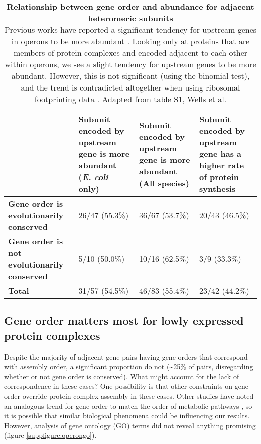 \documentclass[a4paper,11pt,twoside,openright]{scrbook}
\begin{document}
\begin{table}[h]
    \captionsetup{width=0.9\textwidth}
    \caption[Relationship between gene order and abundance for adjacent
    heteromeric subunits]{\sffamily \textbf{Relationship between gene order and
    abundance for adjacent heteromeric subunits} \\ \small Previous works have
    reported a significant tendency for upstream genes in operons to be more
    abundant \cite{Nishizaki2007,Lim2011}. Looking only at proteins that are
    members of protein complexes and encoded adjacent to each other within
    operons, we see a slight tendency for upstream genes to be more abundant.
    However, this is not significant (using the binomial test), and the trend is
    contradicted altogether when using ribosomal footprinting data
    \cite{Li2014b}. Adapted from table S1, Wells et al. \cite{Wells2016}}
    \centering
    \onehalfspacing
    \begin{tabular}{p{30mm} | p{29mm} p{29mm} p{29mm}}
    \hline
    &  \textbf{Subunit encoded by upstream gene is more abundant (\textit{E.
        coli} only)}  & \textbf{Subunit encoded by upstream gene is more
        abundant (All species)} &  \textbf{Subunit encoded by upstream gene has
        a higher rate of protein synthesis}\\[0.1cm]
    \hline
    \raggedright \textbf{Gene order is evolutionarily conserved} & 26/47
        (55.3\%) & 36/67 (53.7\%) &  20/43 (46.5\%)\\
    \raggedright \textbf{Gene order is not evolutionarily conserved} & 5/10
        (50.0\%) & 10/16 (62.5\%) & 3/9 (33.3\%)\\
    \raggedright \textbf{Total} & 31/57 (54.5\%) & 46/83 (55.4\%) & 23/42
        (44.2\%)\\[0.1cm]
    \hline
    \end{tabular}
    \label{table:abundgeneorder}
\end{table}


\subsection{Gene order matters most for lowly expressed protein complexes}
Despite the majority of adjacent gene pairs having gene orders that correspond
with assembly order, a significant proportion do not (\textasciitilde 25\% of
pairs, disregarding whether or not gene order is conserved). What might account
for the lack of correspondence in these cases? One possibility is that other
constraints on gene order override protein complex assembly in these cases.
Other studies have noted an analogous trend for gene order to match the order of
metabolic pathways \cite{Zaslaver2004,Kovacs2009}, so it is possible that
similar biological phenomena could be influencing our results. However, analysis
of gene ontology (GO) terms \cite{Huntley2015} did not reveal anything promising
(figure \ref{suppfigure:operongo}).
\end{document}
